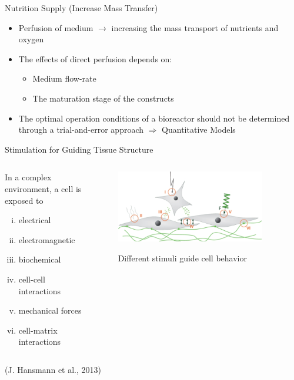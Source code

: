 \documentclass[11pt,t]{beamer}
\begin{document}
\begin{frame}[fragile]{Nutrition Supply (Increase Mass Transfer)}  

\begin{itemize}
\item
Perfusion of medium $\rightarrow$  increasing the mass transport of nutrients and oxygen
\item
The effects of direct perfusion depends on:
\begin{itemize}
\item
Medium flow-rate
\item
The maturation stage of the constructs
\end{itemize}
\item
The optimal operation conditions of a bioreactor should
not be determined through a trial-and-error approach $\Rightarrow$ Quantitative Models
\end{itemize}

\end{frame}


\begin{frame}[fragile]{Stimulation for Guiding Tissue Structure}  

	\begin{columns}[t]
		\begin{column}{.45\textwidth}
		 In a complex environment,
a cell is exposed to 
		\begin{enumerate}[i.]
		\item
		electrical
		\item
		electromagnetic
		\item
		 biochemical
		\item
		cell-cell interactions
		\item		
		mechanical forces 
		\item
		cell-matrix interactions 
		\end{enumerate}
 
		\end{column}
		\begin{column}{.55\textwidth}
			\begin{figure}
			\centering
			\includegraphics[width=0.9\textwidth]{stimuli}
			
			\footnotesize	Different stimuli guide cell behavior
			\end{figure}
		\end{column}
	\end{columns}	
		
	\vfill
	\footnotesize(J. Hansmann et al., 2013)

\end{frame}
\end{document}
